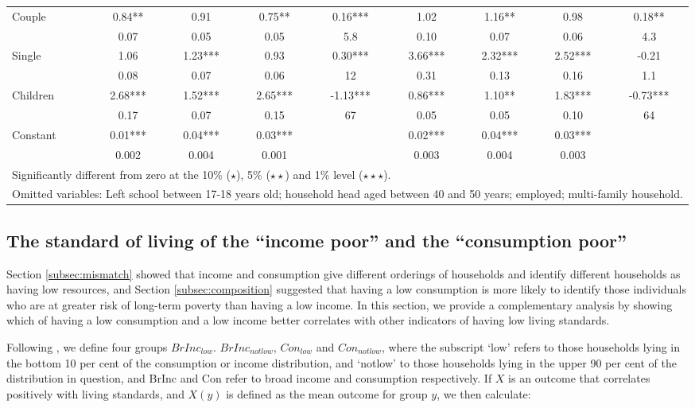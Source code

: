 \begin{table}
\begin{tabular}{l|cccc|cccc}
Couple	&	       0.84**	&	      0.91	&	     0.75**	&	0.16***	
		&	       1.02	&	       1.16**	&	      0.98	&	0.18**	\\
		&	       0.07   	&	0.05	&	0.05	&	5.8	
		&	       0.10   	&	0.07	&	0.06	&	4.3	\\
Single	&	       1.06	&	       1.23*** 	&	   0.93	&	0.30***	
		&	       3.66***	&	     2.32***	&	       2.52***	&	-0.21	\\
		&	       0.08   	&	0.07	&	0.06	&	12	
		&	       0.31   	&	0.13	&	0.16	&	1.1	\\
Children	&	       2.68***	&	     1.52***	&	      2.65***	&	-1.13***	
		&	       0.86***	&	      1.10**	&	       1.83***	&	-0.73***	\\
		&	       0.17   	&	0.07	&	0.15	& 67	
		&	       0.05   	&	0.05	&	0.10	& 64	\\
Constant            	&	       0.01***	&	       0.04***	&	       0.03***	&		&	       0.02***	&	       0.04***	&	       0.03***	&		\\
                    	&	       0.002   	&	0.004	&	0.001 	&		&	       0.003   	&	0.004	&	0.003	&		\\
\hline\hline
\multicolumn{9}{l}{Significantly different from zero at the 10\% ($\star$), 5\% ($\star\star$) and 1\% level ($\star\star\star$).} \\
\multicolumn{9}{l}{Omitted variables: Left school between 17-18 years old; household head aged between 40 and 50 years; employed; multi-family household.}
\end{tabular}
\label{table:interact}
\end{table}

\subsection{The standard of living of the ``income poor'' and the ``consumption poor''}

Section \ref{subsec:mismatch} showed that income and consumption give different orderings of households and identify different households as having low resources, and 
Section \ref{subsec:composition} suggested that having a low consumption is more likely to identify those individuals who are at greater risk of long-term poverty than having a low income. In this section, we provide a complementary analysis by showing which of having a low consumption and a low income better correlates with other indicators of having low living standards. 

Following \citet{meyer2003measuring}, we define four groups $BrInc_{low}$. $BrInc_{notlow}$, $Con_{low}$
and $Con_{notlow}$, where the subscript `low' refers to those households
lying in the bottom 10 per cent of the consumption or income distribution,
and `notlow' to those households lying in the upper 90 per cent of
the distribution in question, and BrInc and Con refer to broad income and consumption respectively. If 
$X$ is an outcome that correlates positively
with living standards, and $X(y)$ is defined as the mean outcome for group
$y$, we then calculate:


